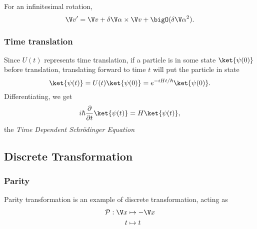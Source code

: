 \documentclass[a4paper]{article}
\newcommand*{\parity}{\mathcal{P}}
\theoremstyle{definition}
\begin{document}
For an infinitesimal rotation,
\[
  \V v' = \V v + \delta\V \alpha\times \V v + \bigO(\delta\V\alpha^2).
\]

\subsubsection{Time translation}

Since \(U(t)\) represents time translation, if a particle is in some state \(\ket{\psi(0)}\) before translation, translating forward to time \(t\) will put the particle in state
\[
  \ket{\psi(t)} = U(t) \ket{\psi(0)} = e^{-iHt/\hbar}\ket{\psi(0)}.
\]
Differentiating, we get
\[
  i\hbar \frac{\partial}{\partial t} \ket{\psi(t)} = H\ket{\psi(t)},
\]
the \emph{Time Dependent Schr\"odinger Equation}

\subsection{Discrete Transformation}

\subsubsection{Parity}

Parity transformation is an example of discrete transformation, acting as
\begin{align*}
  \parity : \V x &\mapsto - \V x \\
  t &\mapsto t
\end{align*}
\end{document}
